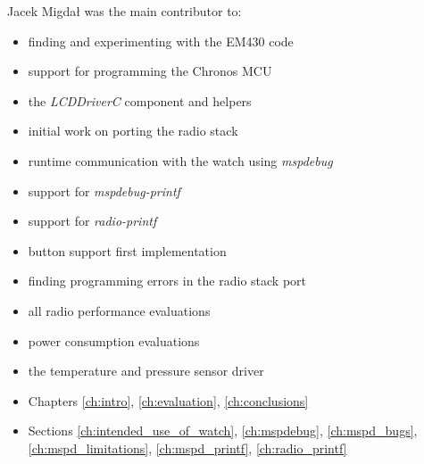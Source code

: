 Jacek Migdał was the main contributor to:
\begin{itemize}\addtolength{\itemsep}{-.35\baselineskip} 
  \item finding and experimenting with the EM430 code
  \item support for programming the Chronos MCU
  \item the \emph{LCDDriverC} component and helpers
  \item initial work on porting the radio stack
  \item runtime communication with the watch using \emph{mspdebug}
  \item support for \emph{mspdebug-printf}
  \item support for \emph{radio-printf}
  \item button support first implementation
  \item finding programming errors in the radio stack port
  \item all radio performance evaluations
  \item power consumption evaluations
  \item the temperature and pressure sensor driver
  \item Chapters \ref{ch:intro}, \ref{ch:evaluation}, \ref{ch:conclusions}
  \item Sections \ref{ch:intended_use_of_watch}, \ref{ch:mspdebug}, \ref{ch:mspd_bugs}, \ref{ch:mspd_limitations}, \ref{ch:mspd_printf}, \ref{ch:radio_printf}
\end{itemize}




